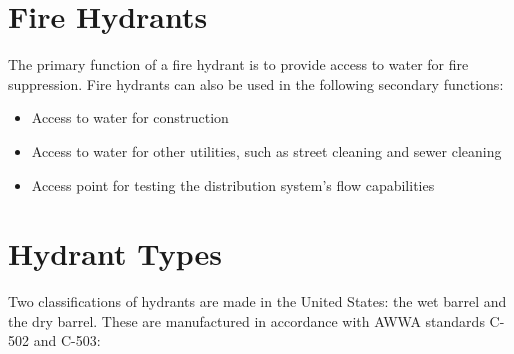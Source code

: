 \documentclass[10pt]{article}
\begin{document}
\section{Fire Hydrants}
The primary function of a fire hydrant is to provide access to water for fire suppression. Fire hydrants can also be used in the following secondary functions:

\begin{itemize}
  \item Access to water for construction

  \item Access to water for other utilities, such as street cleaning and sewer cleaning

  \item Access point for testing the distribution system's flow capabilities

\end{itemize}
\section{Hydrant Types}
Two classifications of hydrants are made in the United States: the wet barrel and the dry barrel. These are manufactured in accordance with AWWA standards C-502 and C-503:
\end{document}
